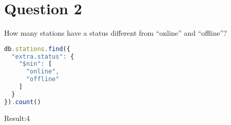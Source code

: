 \section{Question 2}

\begin{question}
  How many stations have a status different from “online” and “offline”?
\end{question}

\begin{answer}

  \begin{lstlisting}[language=js]
db.stations.find({
  "extra.status": {
    "$nin": [
      "online",
      "offline"
    ]
  }
}).count()
  \end{lstlisting}

  Result:4
\end{answer}
\pagebreak
